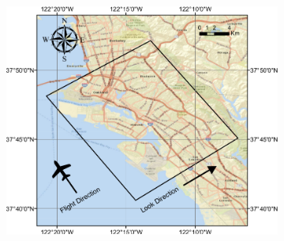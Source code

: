 \begin{figure}[htbp]
	\centering
	\begin{subfigure}[t]{0.6\columnwidth}
	\centering
	\includegraphics[width =\columnwidth]{Figures/Map} \quad
	\vspace{-10pt}
	\caption{}
 	\end{subfigure}%

\vspace{5pt}


\end{figure}
